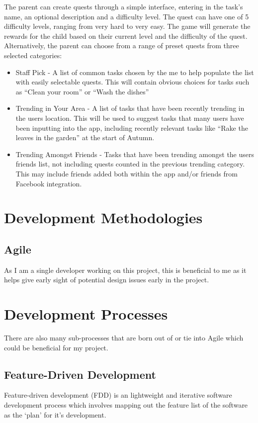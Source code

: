 The parent can create quests through a simple interface, entering in the task's name, an optional description and a difficulty level. 
The quest can have one of 5 difficulty levels, ranging from very hard to very easy.
The game will generate the rewards for the child based on their current level and the difficulty of the quest.
Alternatively, the parent can choose from a range of preset quests from three selected categories:
\begin{itemize}
	\item 
		Staff Pick - A list of common tasks chosen by the me to help populate the list with easily selectable quests. 
		This will contain obvious choices for tasks such as ``Clean your room'' or ``Wash the dishes''
	\item
		Trending in Your Area - A list of tasks that have been recently trending in the users location. 
		This will be used to suggest tasks that many users have been inputting into the app, including recently relevant tasks like ``Rake the leaves in the garden'' at the start of Autumn.
	\item 
		Trending Amongst Friends - Tasks that have been trending amongst the users friends list, not including quests counted in the previous 	trending category. 
		This may include friends added both within the app and/or friends from Facebook integration.  
\end{itemize}

\section{Development Methodologies}
\subsection{Agile}
As I am a single developer working on this project, this is beneficial to me as it helps give early sight of potential design issues early in the project.

\section{Development Processes}
There are also many sub-processes that are born out of or tie into Agile which could be beneficial for my project.

\subsection{Feature-Driven Development}
Feature-driven development (FDD) is an lightweight and iterative software development process which involves mapping out the feature list of the software as the `plan' for it's development.


